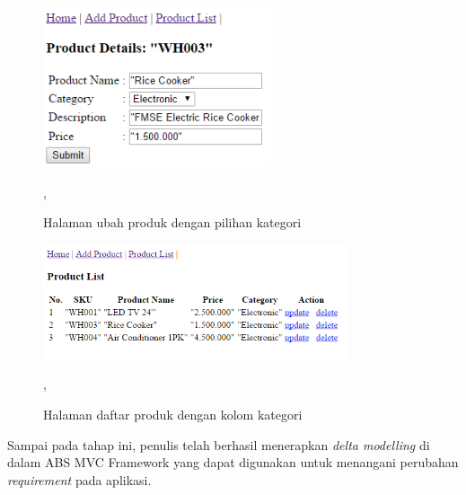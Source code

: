 \begin{figure}
    \centering
    \includegraphics[width=0.6\textwidth]{img/update-product-withCategory}
    \caption{Halaman ubah produk dengan pilihan kategori},
    \label{fig:updateProductWithCategory}
\end{figure}

\begin{figure}
    \centering
    \includegraphics[width=0.8\textwidth]{img/list-product-withCategory}
    \caption{Halaman daftar produk dengan kolom kategori},
    \label{fig:deleteProductWithCategory}
\end{figure}

Sampai pada tahap ini, penulis telah berhasil menerapkan \textit{delta modelling} di dalam ABS MVC Framework yang dapat digunakan untuk menangani perubahan \textit{requirement} pada aplikasi.